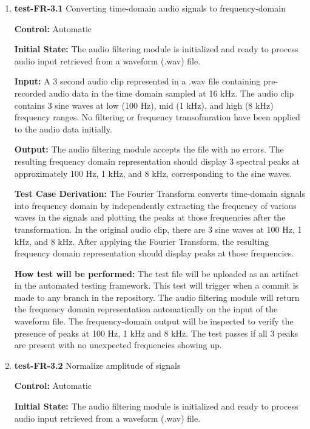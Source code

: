 \documentclass[12pt, titlepage]{article}
\begin{document}
\begin{enumerate}

\item{\textbf{test-FR-3.1} Converting time-domain audio signals to 
frequency-domain \\}

\textbf{Control:} Automatic
					
\textbf{Initial State:} 
The audio filtering module is initialized and ready to process audio input 
retrieved from a waveform (.wav) file. 
					
\textbf{Input:}
A 3 second audio clip represented in a .wav file containing pre-recorded audio 
data in the time domain sampled at 16 kHz. The audio clip contains 3 sine waves 
at low (100 Hz), mid (1 kHz), and high (8 kHz) frequency ranges. No filtering 
or frequency transofmration have been applied to the audio data initially.
					
\textbf{Output:}
The audio filtering module accepts the file with no errors. The resulting 
frequency domain representation should display 3 spectral peaks at 
approximately 100 Hz, 1 kHz, and 8 kHz, corresponding to the sine waves.

\textbf{Test Case Derivation:} 
The Fourier Transform converts time-domain signals into frequency domain by 
independently extracting the frequency of various waves in the signals and 
plotting the peaks at those frequencies after the transformation. In the 
original audio clip, there are 3 sine waves at 100 Hz, 1 kHz, and 8 kHz. After
applying the Fourier Transform, the resulting frequency domain representation
should display peaks at those frequencies.
					
\textbf{How test will be performed:}
The test file will be uploaded as an artifact in the automated testing 
framework. This test will trigger when a commit is made to any branch in the 
repository. The audio filtering module will return the frequency domain 
representation automatically on the input of the waveform file. The 
frequency-domain output will be inspected to verify the presence of peaks at 
100 Hz, 1 kHz and 8 kHz. The test passes if all 3 peaks are present with no 
unexpected frequencies showing up.  
					
\item{\textbf{test-FR-3.2} Normalize amplitude of signals\\}

\textbf{Control:} Automatic
					
\textbf{Initial State:} 
The audio filtering module is initialized and ready to process audio input 
retrieved from a waveform (.wav) file. 
					

\end{enumerate}
\end{document}
